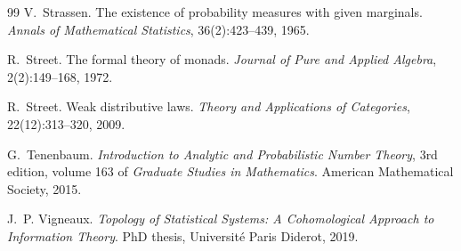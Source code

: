 \documentclass[11pt]{article}
\theoremstyle{definition}
\theoremstyle{remark}
\begin{document}
\begin{thebibliography}{99}
V.~Strassen.
\newblock The existence of probability measures with given marginals.
\newblock \emph{Annals of Mathematical Statistics}, 36(2):423--439, 1965.

R.~Street.
\newblock The formal theory of monads.
\newblock \emph{Journal of Pure and Applied Algebra}, 2(2):149--168, 1972.

R.~Street.
\newblock Weak distributive laws.
\newblock \emph{Theory and Applications of Categories}, 22(12):313--320, 2009.

G.~Tenenbaum.
\newblock \emph{Introduction to Analytic and Probabilistic Number Theory}, 3rd edition, volume 163
  of \emph{Graduate Studies in Mathematics}.
\newblock American Mathematical Society, 2015.

J.~P. Vigneaux.
\newblock \emph{Topology of Statistical Systems: A Cohomological Approach to Information Theory}.
\newblock PhD thesis, Universit\'e Paris Diderot, 2019.

\end{thebibliography}
\end{document}
